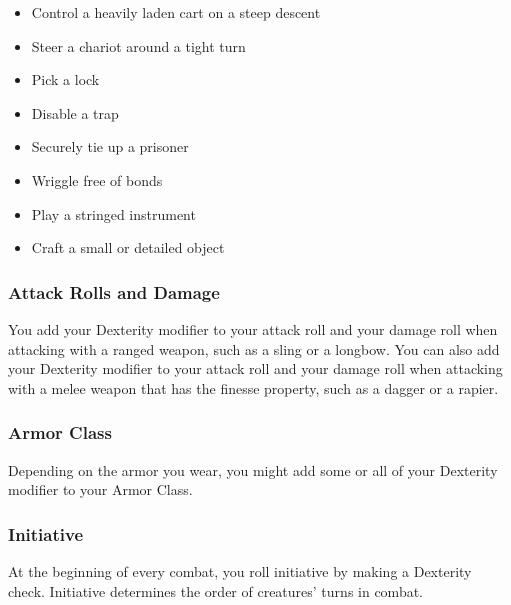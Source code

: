 \begin{itemize}
\item Control a heavily laden cart on a steep descent
\item Steer a chariot around a tight turn
\item Pick a lock
\item Disable a trap
\item Securely tie up a prisoner
\item Wriggle free of bonds
\item Play a stringed instrument
\item Craft a small or detailed object
\end{itemize}

\subsubsection{Attack Rolls and Damage}

You add your Dexterity modifier to your attack roll and your damage roll when attacking with a ranged weapon, such as a sling or a longbow. You can also add your Dexterity modifier to your attack roll and your damage roll when attacking with a melee weapon that has the finesse property, such as a dagger or a rapier.

\subsubsection{Armor Class}

Depending on the armor you wear, you might add some or all of your Dexterity modifier to your Armor Class.

\subsubsection{Initiative} \label{sec:initiative}

At the beginning of every combat, you roll initiative by making a Dexterity check. Initiative determines the order of creatures' turns in combat.

